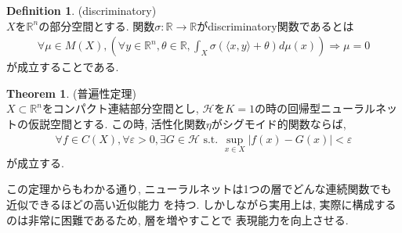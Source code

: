\documentclass[11pt, a4paper, dvipdfmx]{jsarticle}
\theoremstyle{definition}
\newtheorem{Definition+}[Axiom+]{Definition}
\newtheorem{Theorem+}[Axiom+]{Theorem}
\newcommand{\R}{\mathbb{R}}
\newcommand{\Hil}{\mathcal{H}}
\newcommand{\e}{\varepsilon}
\def\inner<#1>{\langle #1 \rangle}
\begin{document}
\begin{Definition+}(discriminatory)\\
    $X$を$\R^n$の部分空間とする. 関数$\sigma:\R\to\R$がdiscriminatory関数であるとは
    \begin{align*}
        \forall\mu\in M(X), \left(\forall y\in\R^n, \theta\in\R, \int_{X}\sigma(\inner<x, y> + \theta)d\mu(x)\right)\Longrightarrow\mu = 0
    \end{align*}
    が成立することである. 
\end{Definition+}
\begin{Theorem+}(普遍性定理)\\
    $X\subset\R^n$をコンパクト連結部分空間とし, $\Hil$を$K = 1$の時の回帰型ニューラルネットの仮説空間とする. 
    この時, 活性化関数$\eta$がシグモイド的関数ならば, 
    \begin{align*}
        \forall f\in C(X), \forall\e> 0, \exists G\in\Hil\text{ s.t. } \sup_{x\in X}|f(x) - G(x)| < \e
    \end{align*}
    が成立する. 
\end{Theorem+}
この定理からもわかる通り, ニューラルネットは1つの層でどんな連続関数でも近似できるほどの高い近似能力
を持つ. しかしながら実用上は, 実際に構成するのは非常に困難であるため, 層を増やすことで
表現能力を向上させる.
\end{document}
